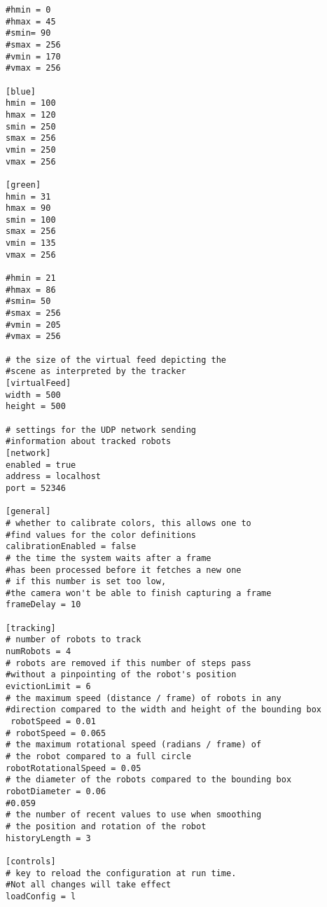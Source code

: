 \begin{lstlisting}
#hmin = 0
#hmax = 45
#smin= 90
#smax = 256
#vmin = 170
#vmax = 256

[blue]
hmin = 100
hmax = 120
smin = 250
smax = 256
vmin = 250
vmax = 256

[green]
hmin = 31
hmax = 90
smin = 100
smax = 256
vmin = 135
vmax = 256

#hmin = 21
#hmax = 86
#smin= 50
#smax = 256
#vmin = 205
#vmax = 256

# the size of the virtual feed depicting the 
#scene as interpreted by the tracker
[virtualFeed]
width = 500
height = 500
 
# settings for the UDP network sending 
#information about tracked robots
[network]
enabled = true 
address = localhost
port = 52346

[general]
# whether to calibrate colors, this allows one to 
#find values for the color definitions
calibrationEnabled = false
# the time the system waits after a frame 
#has been processed before it fetches a new one
# if this number is set too low, 
#the camera won't be able to finish capturing a frame
frameDelay = 10

[tracking]
# number of robots to track
numRobots = 4
# robots are removed if this number of steps pass 
#without a pinpointing of the robot's position
evictionLimit = 6
# the maximum speed (distance / frame) of robots in any 
#direction compared to the width and height of the bounding box
 robotSpeed = 0.01
# robotSpeed = 0.065
# the maximum rotational speed (radians / frame) of
# the robot compared to a full circle
robotRotationalSpeed = 0.05
# the diameter of the robots compared to the bounding box
robotDiameter = 0.06
#0.059
# the number of recent values to use when smoothing
# the position and rotation of the robot
historyLength = 3

[controls]
# key to reload the configuration at run time. 
#Not all changes will take effect
loadConfig = l
\end{lstlisting}